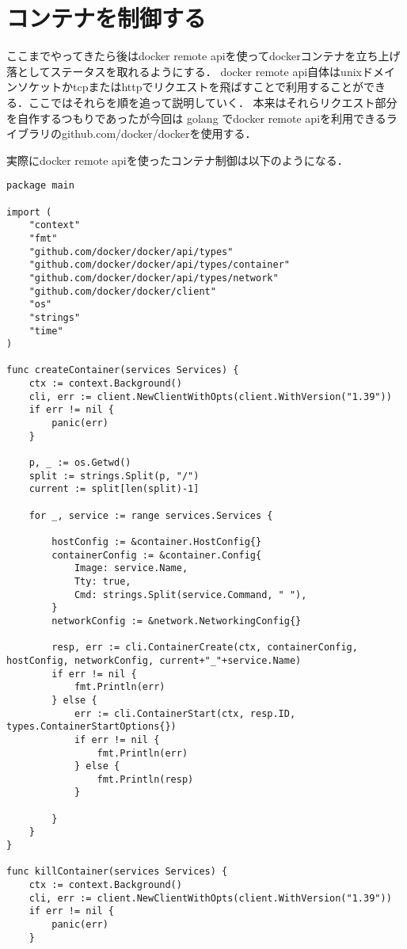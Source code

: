 \section{コンテナを制御する}

ここまでやってきたら後はdocker remote apiを使ってdockerコンテナを立ち上げ落としてステータスを取れるようにする．
docker remote api自体はunixドメインソケットかtcpまたはhttpでリクエストを飛ばすことで利用することができる．ここではそれらを順を追って説明していく．
本来はそれらリクエスト部分を自作するつもりであったが今回は golang でdocker remote apiを利用できるライブラリのgithub.com/docker/dockerを使用する．


実際にdocker remote apiを使ったコンテナ制御は以下のようになる．
\begin{verbatim}
package main

import (
    "context"
    "fmt"
    "github.com/docker/docker/api/types"
    "github.com/docker/docker/api/types/container"
    "github.com/docker/docker/api/types/network"
    "github.com/docker/docker/client"
    "os"
    "strings"
    "time"
)

func createContainer(services Services) {
    ctx := context.Background()
    cli, err := client.NewClientWithOpts(client.WithVersion("1.39"))
    if err != nil {
        panic(err)
    }

    p, _ := os.Getwd()
    split := strings.Split(p, "/")
    current := split[len(split)-1]

    for _, service := range services.Services {

        hostConfig := &container.HostConfig{}
        containerConfig := &container.Config{
            Image: service.Name,
            Tty: true,
            Cmd: strings.Split(service.Command, " "),
        }
        networkConfig := &network.NetworkingConfig{}

        resp, err := cli.ContainerCreate(ctx, containerConfig, hostConfig, networkConfig, current+"_"+service.Name)
        if err != nil {
            fmt.Println(err)
        } else {
            err := cli.ContainerStart(ctx, resp.ID, types.ContainerStartOptions{})
            if err != nil {
                fmt.Println(err)
            } else {
                fmt.Println(resp)
            }

        }
    }
}

func killContainer(services Services) {
    ctx := context.Background()
    cli, err := client.NewClientWithOpts(client.WithVersion("1.39"))
    if err != nil {
        panic(err)
    }


\end{verbatim}
